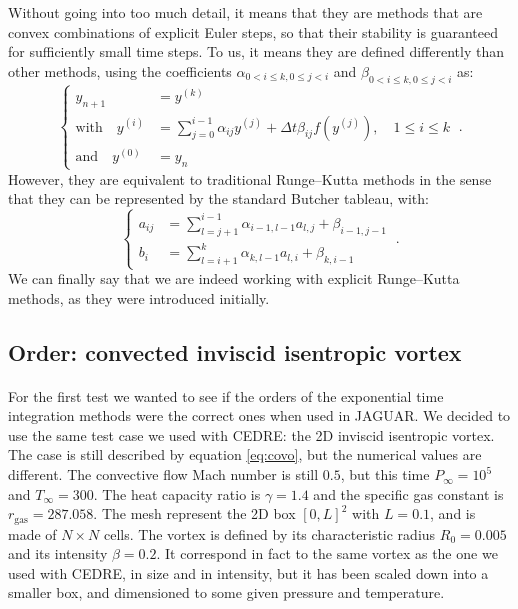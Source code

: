     Without going into too much detail, it means that they are methods that are convex combinations of explicit Euler steps, so that their stability is guaranteed for sufficiently small time steps.
    To us, it means they are defined differently than other methods, using the coefficients $\alpha_{0 < i \leq k, 0\leq j < i}$ and $\beta_{0 < i \leq k, 0\leq j < i}$ as:
    \begin{equation}
      \left\{\begin{aligned}
        y_{n+1} &= y^{\left(k\right)} \\
        \textrm{with}\quad y^{\left(i\right)} &= \sum_{j = 0}^{i-1} \alpha_{ij} y^{\left(j\right)} + \Delta t \beta_{ij} f\left(y^{\left(j\right)}\right) , \quad 1 \leq i \leq k\\
        \textrm{and}\quad y^{\left(0\right)} &= y_n
      \end{aligned}\right. \ .
    \end{equation}
    However, they are equivalent to traditional Runge--Kutta methods in the sense that they can be represented by the standard Butcher tableau, with:
    \begin{equation}
      \left\{\begin{aligned}
        a_{ij} &= \sum_{l = j+1}^{i-1} \alpha_{i-1, l-1} a_{l, j} + \beta_{i-1, j-1} \\
        b_i &= \sum_{l = i+1}^{k} \alpha_{k, l-1} a_{l, i} + \beta_{k, i-1}
      \end{aligned}\right. \ .
    \end{equation}
    We can finally say that we are indeed working with explicit Runge--Kutta methods, as they were introduced initially.


    \subsection{Order: convected inviscid isentropic vortex}

      \paragraph{}
      For the first test we wanted to see if the orders of the exponential time integration methods were the correct ones when used in JAGUAR.
      We decided to use the same test case we used with CEDRE: the 2D inviscid isentropic vortex.
      The case is still described by equation \ref{eq:covo}, but the numerical values are different.
      The convective flow Mach number is still $0.5$, but this time $P_\infty = 10^5$ and $T_\infty = 300$.
      The heat capacity ratio is $\gamma = 1.4$ and the specific gas constant is $r_\textrm{gas} = 287.058$.
      The mesh represent the 2D box $\left[0, L\right]^2$ with $L = 0.1$, and is made of $N \times N$ cells.
      The vortex is defined by its characteristic radius $R_0 = 0.005$ and its intensity $\beta = 0.2$.
      It correspond in fact to the same vortex as the one we used with CEDRE, in size and in intensity, but it has been scaled down into a smaller box, and dimensioned to some given pressure and temperature.

